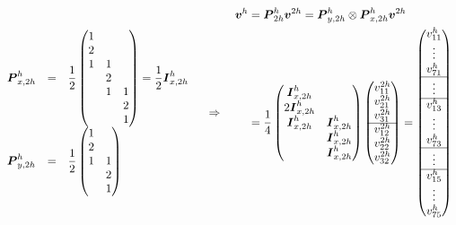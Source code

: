 \documentclass[12pt, UTF8, nofonts]{ctexart}
\begin{document}
\begin{equation}
  \label{eq:2dmatform}
  \begin{array}{lcl}
    \boldsymbol{P}_{x,2h}^{h} &=& \dfrac{1}{2}
    \begin{pmatrix}
      1 & & \\ 2 & & \\ 1 & 1 & \\ & 2 & \\ & 1 & 1 \\ & & 2 \\ & & 1 \\
    \end{pmatrix} = \dfrac{1}{2}\boldsymbol{I}_{x,2h}^{h}\\
    \boldsymbol{P}_{y,2h}^{h} &=& \dfrac{1}{2}
    \begin{pmatrix}
      1 & \\ 2 & \\ 1 & 1 \\ & 2 \\ & 1 \\
    \end{pmatrix} \\
  \end{array} \quad\Rightarrow\quad
  \begin{aligned}
    \boldsymbol{v}^{h} &= \boldsymbol{P}_{2h}^{h}\boldsymbol{v}^{2h} = \boldsymbol{P}_{y,2h}^{h} \otimes \boldsymbol{P}_{x,2h}^{h} \boldsymbol{v}^{2h} \\
    &= \dfrac{1}{4}
    \begin{pmatrix}
      \boldsymbol{I}_{x,2h}^{h} & \\ 2\boldsymbol{I}_{x,2h}^{h} & \\ \boldsymbol{I}_{x,2h}^{h} & \boldsymbol{I}_{x,2h}^{h} \\ & \boldsymbol{I}_{x,2h}^{h} \\ & \boldsymbol{I}_{x,2h}^{h} \\
    \end{pmatrix}
    \begin{pmatrix}
      v_{11}^{2h} \\ v_{21}^{2h} \\ v_{31}^{2h} \\ \cline{1-1} v_{12}^{2h} \\ v_{22}^{2h} \\ v_{32}^{2h}
    \end{pmatrix} =
    \begin{pmatrix}
      v_{11}^{h} \\ \vdots \\ v_{71}^{h} \\ \cline{1-1} \vdots \\ \cline{1-1}
      v_{13}^{h} \\ \vdots \\ v_{73}^{h} \\ \cline{1-1} \vdots \\ \cline{1-1}
      v_{15}^{h} \\ \vdots \\ v_{75}^{h}
    \end{pmatrix} \\
  \end{aligned}
\end{equation}
\end{document}
